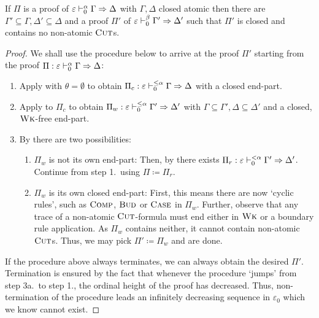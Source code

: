 \begin{theorem}\label{lem:cpa-cons}
  If $\Pi$ is a proof of $\varepsilon \vdash^\alpha_0 \Gamma \Rightarrow \Delta$ with $\Gamma, \Delta$
  closed atomic then there are $\Gamma' \subseteq \Gamma, \Delta' \subseteq
  \Delta$ and a proof $\Pi'$ of $\varepsilon \vdash^\beta_0 \Gamma' \Rightarrow
  \Delta'$ such that $\Pi'$ is closed and contains no non-atomic $\textsc{Cut}$s.
\end{theorem}
\begin{proof}
  We shall use the procedure below to arrive at the proof $\Pi'$ starting from
  the proof $\Pi : \varepsilon \vdash^\alpha_0 \Gamma \Rightarrow \Delta$:
  \begin{enumerate}
  \item Apply  with $\theta = \emptyset$ to obtain
    $\Pi_c : \varepsilon \vdash^{\leq \alpha}_0 \Gamma \Rightarrow \Delta$
    with a closed end-part.
  \item Apply  to $\Pi_c$ to obtain $\Pi_w : \varepsilon
    \vdash^{\leq \alpha}_0 \Gamma' \Rightarrow \Delta'$ with $\Gamma \subseteq
    \Gamma', \Delta \subseteq \Delta'$ and a closed, $\textsc{Wk}$-free end-part.
  \item By  there are two possibilities:
    \begin{enumerate}[label=(\alph*)]
    \item $\Pi_w$ is not its own end-part: Then, by 
      there exists $\Pi_r : \varepsilon \vdash^{< \alpha}_0 \Gamma' \Rightarrow
      \Delta'$. Continue from step 1.\ using $\Pi \coloneq \Pi_r$.
    \item $\Pi_w$ is its own closed end-part: First, this means there are now
      `cyclic rules', such as $\textsc{Comp}$, $\textsc{Bud}$ or $\textsc{Case}$ in $\Pi_w$.
      Further, observe that any trace of a non-atomic $\textsc{Cut}$-formula must end
      either in $\textsc{Wk}$ or a boundary rule application. As $\Pi_w$ contains
      neither, it cannot contain non-atomic $\textsc{Cut}$s. Thus, we may pick $\Pi'
      \coloneq \Pi_w$ and are done.
    \end{enumerate}
  \end{enumerate}
  If the procedure above always terminates, we can always obtain the desired
  $\Pi'$. Termination is ensured by the fact that whenever the procedure `jumps'
  from step 3a.\ to step 1., the ordinal height of the proof has decreased.
  Thus, non-termination of the procedure leads an infinitely decreasing sequence
  in $\varepsilon_0$ which we know cannot exist.
\end{proof}

